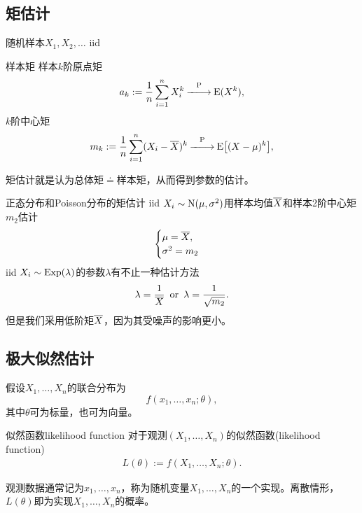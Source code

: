 \subsection{矩估计}
随机样本$X_1,X_2,\ldots$ iid
\begin{definition}{样本矩}{}
	样本$k$阶原点矩
	\[
		a_k:=\frac1n\sum_{i=1}^nX_i^k\overset{\operatorname{P}}{-\hspace{-4 pt}-\hspace{-5 pt}\longrightarrow}\operatorname{E}(X^k),
	\]
	$k$阶中心矩
	\[
		m_k:=\frac1n\sum_{i=1}^n(X_i-\overline X)^k\overset{\operatorname{P}}{-\hspace{-4 pt}-\hspace{-5 pt}\longrightarrow}\operatorname{E}\bigl[(X-\mu)^k\bigr],
	\]
\end{definition}
矩估计就是认为总体矩$\doteq$样本矩，从而得到参数的估计。
\begin{example}{正态分布和Poisson分布的矩估计}{}
	iid $X_i\sim\operatorname{N}(\mu,\sigma^2)$用样本均值$\overline X$和样本2阶中心矩$m_2$估计
	\begin{align*}
		\begin{cases}
			\mu=\overline X,\\
			\sigma^2=m_2
		\end{cases}
	\end{align*}
	\tcblower
	iid $X_i\sim\operatorname{Exp}(\lambda)$的参数$\lambda$有不止一种估计方法
	\begin{align*}
		\lambda=\frac1{\overline X}\enspace\text{or}\enspace\lambda=\frac1{\sqrt{m_2}}.
	\end{align*}
	但是我们采用低阶矩$\overline X$，因为其受噪声的影响更小。
\end{example}
\subsection{极大似然估计}
假设$X_1,\ldots,X_n$的联合分布为 
\[
	f(x_1,\ldots,x_n;\theta),
\]
其中$\theta$可为标量，也可为向量。
\begin{definition}{似然函数}{likelihood function}
	对于观测$(X_1,\ldots,X_n)$的似然函数(likelihood function)
	\begin{align}
		L(\theta):=f(X_1,\ldots,X_n;\theta).
	\end{align}
\end{definition}
观测数据通常记为$x_1,\ldots,x_n$，称为随机变量$X_1,\ldots,X_n$的一个实现。离散情形，$L(\theta)$即为实现$X_1,\ldots,X_n$的概率。

